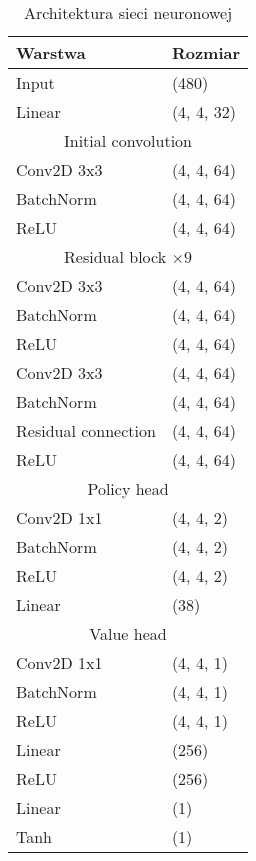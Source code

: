 \begin{table}
    \centering
    \caption{Architektura sieci neuronowej}
    \label{tab:nn-architecture}
    \begin{tabular}{ll}
        \toprule
        Warstwa & Rozmiar \\ \midrule
        Input & (480) \\
        Linear & (4, 4, 32) \\
        \midrule
        \multicolumn{2}{c}{Initial convolution} \\
        Conv2D 3x3 & (4, 4, 64) \\
        BatchNorm & (4, 4, 64) \\
        ReLU & (4, 4, 64) \\
        \midrule
        \multicolumn{2}{c}{Residual block $\times 9$} \\
        Conv2D 3x3 & (4, 4, 64) \\
        BatchNorm & (4, 4, 64) \\
        ReLU & (4, 4, 64) \\
        Conv2D 3x3 & (4, 4, 64) \\
        BatchNorm & (4, 4, 64) \\
        Residual connection & (4, 4, 64) \\
        ReLU & (4, 4, 64) \\
        \midrule
        \multicolumn{2}{c}{Policy head} \\
        Conv2D 1x1 & (4, 4, 2) \\
        BatchNorm & (4, 4, 2) \\
        ReLU & (4, 4, 2) \\
        Linear & (38) \\
        \midrule
        \multicolumn{2}{c}{Value head} \\
        Conv2D 1x1 & (4, 4, 1) \\
        BatchNorm & (4, 4, 1) \\
        ReLU & (4, 4, 1) \\
        Linear & (256) \\
        ReLU & (256) \\
        Linear & (1) \\
        Tanh & (1) \\
        \bottomrule
    \end{tabular}
\end{table}


